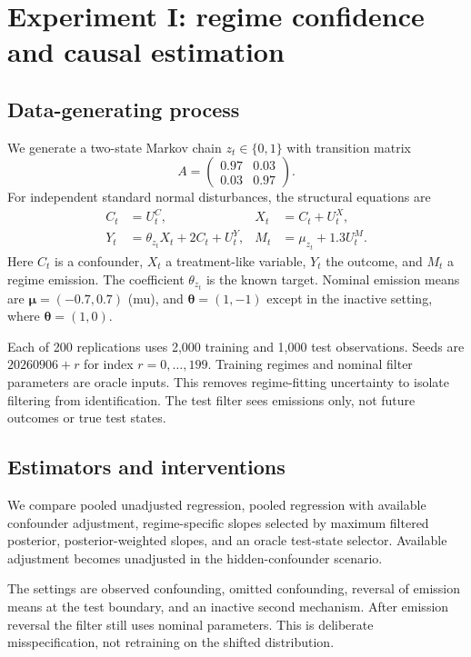 \section{Experiment I: regime confidence and causal estimation}
\subsection{Data-generating process}
We generate a two-state Markov chain $z_t\in\{0,1\}$ with transition matrix
\[
A=\begin{pmatrix}0.97&0.03\\0.03&0.97\end{pmatrix}.
\]
For independent standard normal disturbances, the structural equations are
\begin{align}
C_t&=U^C_t,&X_t&=C_t+U^X_t,\\
Y_t&=\theta_{z_t}X_t+2C_t+U^Y_t,&
M_t&=\mu_{z_t}+1.3U^M_t.
\label{eq:diagnostic}
\end{align}
Here $C_t$ is a confounder, $X_t$ a treatment-like variable, $Y_t$ the outcome, and $M_t$ a regime emission. The coefficient $\theta_{z_t}$ is the known target. Nominal emission means are $\boldsymbol\mu=(-0.7,0.7)$ (mu), and $\boldsymbol\theta=(1,-1)$ except in the inactive setting, where $\boldsymbol\theta=(1,0)$.

Each of 200 replications uses 2,000 training and 1,000 test observations. Seeds are $20260906+r$ for index $r=0,\ldots,199$. Training regimes and nominal filter parameters are oracle inputs. This removes regime-fitting uncertainty to isolate filtering from identification. The test filter sees emissions only, not future outcomes or true test states.

\subsection{Estimators and interventions}
We compare pooled unadjusted regression, pooled regression with available confounder adjustment, regime-specific slopes selected by maximum filtered posterior, posterior-weighted slopes, and an oracle test-state selector. Available adjustment becomes unadjusted in the hidden-confounder scenario.

The settings are observed confounding, omitted confounding, reversal of emission means at the test boundary, and an inactive second mechanism. After emission reversal the filter still uses nominal parameters. This is deliberate misspecification, not retraining on the shifted distribution.

